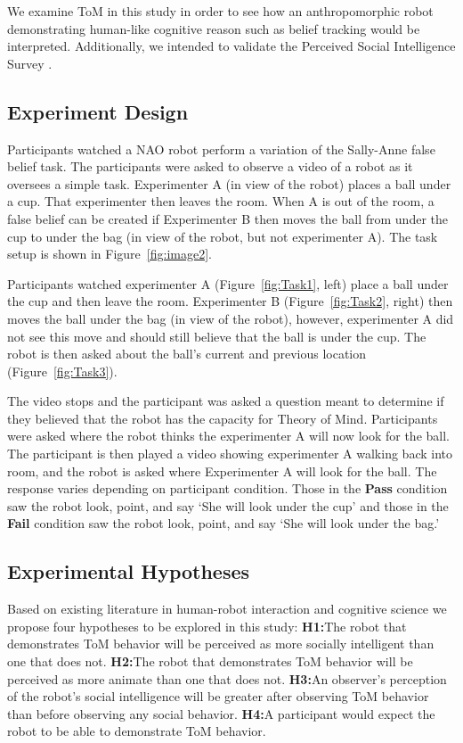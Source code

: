 \documentclass[letterpaper, 10 pt, conference]{ieeeconf}  %
\begin{document}
We examine ToM in this study in order to see how an anthropomorphic robot demonstrating human-like cognitive reason such as belief tracking would be interpreted. Additionally, we intended to validate the Perceived Social Intelligence Survey \cite{PSI}. 

\subsection{Experiment Design}

Participants watched a NAO robot perform a variation of the Sally-Anne false belief task. The participants were asked to observe a video of a robot as it oversees a simple task. Experimenter A (in view of the robot) places a ball under a cup. That experimenter then leaves the room. When A is out of the room, a false belief can be created if Experimenter B then moves the ball from under the cup to under the bag (in view of the robot, but not experimenter A). The task setup is shown in Figure~\ref{fig:image2}.

Participants watched experimenter A (Figure~\ref{fig:Task1}, left) place a ball under the cup and then leave the room. Experimenter B (Figure~\ref{fig:Task2}, right) then moves the ball under the bag (in view of the robot), however, experimenter A did not see this move and should still believe that the ball is under the cup. The robot is then asked about the ball's current and previous location (Figure~\ref{fig:Task3}).

The video stops and the participant was asked a question meant to determine if they believed that the robot has the capacity for Theory of Mind. Participants were asked where the robot thinks the experimenter A will now look for the ball. The participant is then played a video showing experimenter A walking back into room, and the robot is asked where Experimenter A will look for the ball. The response varies depending on participant condition. Those in the {\bf Pass} condition saw the robot look, point, and say `She will look under the cup' and those in the {\bf Fail} condition saw the robot look, point, and say `She will look under the bag.' 


\subsection{Experimental Hypotheses}

Based on existing literature in human-robot interaction and cognitive science we propose four hypotheses to be explored in this study: \newline
\textbf{H1:}The robot that demonstrates ToM behavior will be perceived as more socially intelligent than one that does not.\newline
\textbf{H2:}The robot that demonstrates ToM behavior will be perceived as more animate than one that does not.\newline
\textbf{H3:}An observer's perception of the robot's social intelligence will be greater after observing ToM behavior than before observing any social behavior.\newline
\textbf{H4:}A participant would expect the robot to be able to demonstrate ToM behavior.
 
\end{document}

